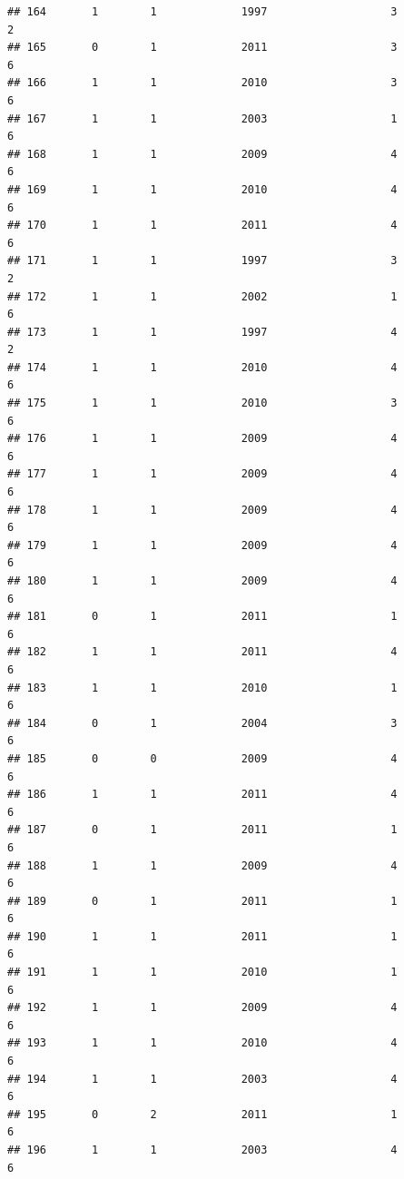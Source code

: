 \documentclass[
]{article}
\begin{document}
\begin{verbatim}
## 164       1        1             1997                   3                 2
## 165       0        1             2011                   3                 6
## 166       1        1             2010                   3                 6
## 167       1        1             2003                   1                 6
## 168       1        1             2009                   4                 6
## 169       1        1             2010                   4                 6
## 170       1        1             2011                   4                 6
## 171       1        1             1997                   3                 2
## 172       1        1             2002                   1                 6
## 173       1        1             1997                   4                 2
## 174       1        1             2010                   4                 6
## 175       1        1             2010                   3                 6
## 176       1        1             2009                   4                 6
## 177       1        1             2009                   4                 6
## 178       1        1             2009                   4                 6
## 179       1        1             2009                   4                 6
## 180       1        1             2009                   4                 6
## 181       0        1             2011                   1                 6
## 182       1        1             2011                   4                 6
## 183       1        1             2010                   1                 6
## 184       0        1             2004                   3                 6
## 185       0        0             2009                   4                 6
## 186       1        1             2011                   4                 6
## 187       0        1             2011                   1                 6
## 188       1        1             2009                   4                 6
## 189       0        1             2011                   1                 6
## 190       1        1             2011                   1                 6
## 191       1        1             2010                   1                 6
## 192       1        1             2009                   4                 6
## 193       1        1             2010                   4                 6
## 194       1        1             2003                   4                 6
## 195       0        2             2011                   1                 6
## 196       1        1             2003                   4                 6

\end{verbatim}
\end{document}

